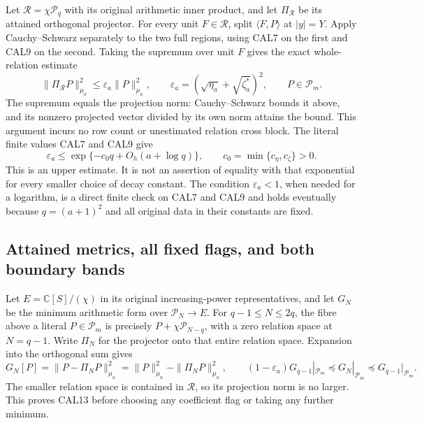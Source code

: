 Let $\mathcal R=\chi\mathcal P_q$ with its original arithmetic
inner product, and let $\Pi_{\mathcal R}$ be its attained
orthogonal projector. For every unit $F\in\mathcal R$, split
$\langle F,P\rangle$ at $|y|=Y$. Apply Cauchy--Schwarz separately
to the two full regions, using CAL7 on the first and CAL9 on the
second. Taking the supremum over unit $F$ gives the exact
whole-relation estimate
\[
 \|\Pi_{\mathcal R}P\|_{\mu_a}^2\le\varepsilon_a\|P\|_{\mu_a}^2,
 \qquad
 \varepsilon_a=(\sqrt{\eta_a}+\sqrt{\zeta_a^*})^2,
 \qquad P\in\mathcal P_m.
 \tag{CAL11}
\]
The supremum equals the projection norm: Cauchy--Schwarz bounds it
above, and its nonzero projected vector divided by its own norm
attains the bound. This argument incurs no row count or unestimated
relation cross block. The literal finite values CAL7 and CAL9 give
\[
 \varepsilon_a\le
       \exp\{-c_0q+O_h(a+\log q)\},\qquad
 c_0=\min\{c_\eta,c_\zeta\}>0.
 \tag{CAL12}
\]
This is an upper estimate. It is not an assertion of equality with
that exponential for every smaller choice of decay constant.
The condition $\varepsilon_a<1$, when needed for a logarithm, is a
direct finite check on CAL7 and CAL9 and holds eventually because
$q=(a+1)^2$ and all original data in their constants are fixed.

\subsection{Attained metrics, all fixed flags, and both boundary bands}

Let $E=\mathbb C[S]/(\chi)$ in its original increasing-power
representatives, and let $G_N$ be the minimum arithmetic form over
$\mathcal P_N\to E$. For $q-1\le N\le2q$, the fibre above a
literal $P\in\mathcal P_m$ is precisely
$P+\chi\mathcal P_{N-q}$, with a zero relation space at $N=q-1$.
Write $\Pi_N$ for the projector onto that entire relation space.
Expansion into the orthogonal sum gives
\[
 G_N[P]=\|P-\Pi_NP\|_{\mu_a}^2
       =\|P\|_{\mu_a}^2-\|\Pi_NP\|_{\mu_a}^2,
 \qquad
 (1-\varepsilon_a)G_{q-1}|_{\mathcal P_m}
       \preceq G_N|_{\mathcal P_m}
       \preceq G_{q-1}|_{\mathcal P_m}.
 \tag{CAL13}
\]
The smaller relation space is contained in $\mathcal R$, so its
projection norm is no larger. This proves CAL13 before choosing
any coefficient flag or taking any further minimum.

